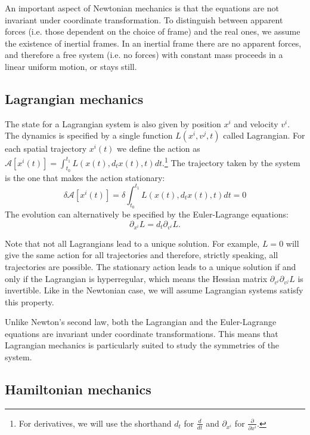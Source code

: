 An important aspect of Newtonian mechanics is that the equations are not invariant under coordinate transformation. To distinguish between apparent forces (i.e. those dependent on the choice of frame) and the real ones, we assume the existence of inertial frames. In an inertial frame there are no apparent forces, and therefore a free system (i.e. no forces) with constant mass proceeds in a linear uniform motion, or stays still.

\subsection{Lagrangian mechanics}

The state for a Lagrangian system is also given by position $x^i$ and velocity $v^i$. The dynamics is specified by a single function $L(x^i, v^j, t)$ called Lagrangian. For each spatial trajectory $x^i(t)$ we define the action as $\mathcal{A}[x^i(t)] = \int_{t_0}^{t_1} L(x(t), d_t x(t), t) dt$.\footnote{For derivatives, we will use the shorthand $d_t$ for $\frac{d}{dt}$ and $\partial_{x^i}$ for $\frac{\partial}{\partial x^i}$. } The trajectory taken by the system is the one that makes the action stationary:
\begin{equation}
\delta \mathcal{A}[x^i(t)] = \delta \int_{t_0}^{t_1} L\left(x(t), d_t x(t), t\right) dt=0
\end{equation}
The evolution can alternatively be specified by the Euler-Lagrange equations:
\begin{equation}\label{rp-cm-EulerLagrange}
	\partial_{x^i}L=d_t \partial_{v^i} L.
\end{equation}

Note that not all Lagrangians lead to a unique solution. For example, $L=0$ will give the same action for all trajectories and therefore, strictly speaking, all trajectories are possible. The stationary action leads to a unique solution if and only if the Lagrangian is hyperregular, which means the Hessian matrix $\partial_{v^i}\partial_{v^j} L$ is invertible. Like in the Newtonian case, we will assume Lagrangian systems satisfy this property.

Unlike Newton's second law, both the Lagrangian and the Euler-Lagrange equations are invariant under coordinate transformations. This means that Lagrangian mechanics is particularly suited to study the symmetries of the system.

\subsection{Hamiltonian mechanics}

